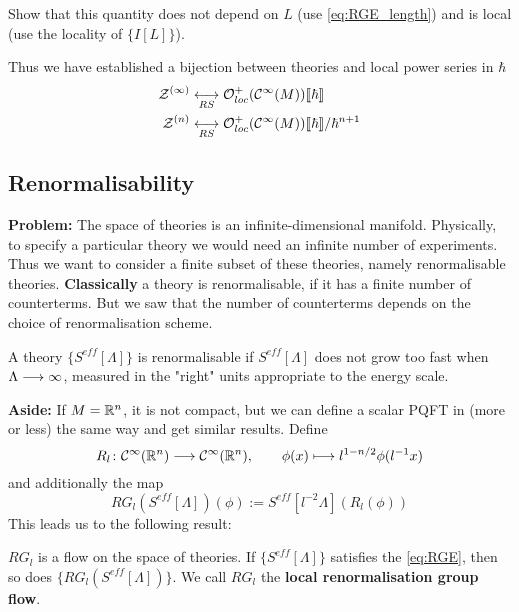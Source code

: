 \begin{ex}
  Show that this quantity does not depend on $L$ (use \eqref{eq:RGE_length}) and is local (use the locality of $\{I[L]\}$).
\end{ex}

Thus we have established a bijection between theories and local power series in $\hbar$
\begin{align}
  \mathcal{Z}^{(\infty)} &\underset{RS}{\longleftrightarrow} \mathcal{O}^+_{loc}(\mathcal{C}^{\infty}(M))\llbracket \hbar \rrbracket \\
  \mathcal{Z}^{(n)} &\underset{RS}{\longleftrightarrow} \mathcal{O}^+_{loc}(\mathcal{C}^{\infty}(M))\llbracket \hbar \rrbracket / \hbar^{n+1}
\end{align}


\subsection{Renormalisability}

\textbf{Problem:} The space of theories is an infinite-dimensional manifold. Physically, to specify a particular theory we would need an infinite number of experiments.\\

Thus we want to consider a finite subset of these theories, namely renormalisable theories. \textbf{Classically} a theory is renormalisable, if it has a finite number of counterterms. But we saw that the number of counterterms depends on the choice of renormalisation scheme.

\begin{principle}
  A theory $\{S^{eff}[\Lambda]\}$ is renormalisable if $S^{eff}[\Lambda]$ does not grow too fast when $\Lambda \longrightarrow \infty$, measured in the "right" units appropriate to the energy scale.
\end{principle}


\textbf{Aside:} If $M = \mathbb{R}^n$, it is not compact, but we can define a scalar PQFT in (more or less) the same way and get similar results. Define
$$ R_l \colon \Ci(\RR^n) \lra \Ci(\RR^n), \quad \quad \phi(x) \lmap l^{1-n/2} \phi(l^{-1} x) $$
and additionally the map
$$ RG_l (S^{eff}[\Lambda]) (\phi) := S^{eff}[l^{-2} \Lambda](R_l(\phi)) $$
This leads us to the following result:

\begin{lem}
  $RG_l$ is a flow on the space of theories. If $ \{S^{eff}[\Lambda]\}$ satisfies the \eqref{eq:RGE}, then so does $\{RG_l(S^{eff}[\Lambda])\}$. We call $RG_l$ the \textbf{local renormalisation group flow}.
\end{lem}


